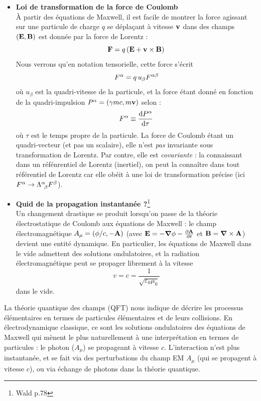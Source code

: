 \begin{itemize}
    \item \textbf{Loi de transformation de la force de Coulomb}\\
    À partir des équations de Maxwell, il est facile de montrer la force agissant sur une particule de charge $q$ se déplaçant à vitesse $\bm{\mathrm{v}}$ dans des champs $(\bm{\mathrm{E}},\bm{\mathrm{B}})$ est donnée par la force de Lorentz :
    \begin{equation}
        \bm{\mathrm{F}} = q\,  (\bm{\mathrm{E}} + \bm{\mathrm{v}} \times \bm{\mathrm{B}})
    \end{equation}
    Nous verrons qu'en notation tensorielle, cette force s'écrit 
    \begin{equation}
        F^\alpha = q \, u_\beta F\indices{^\alpha ^\beta}
    \end{equation}
    où $u_\beta$ est la quadri-vitesse de la particule, et la force étant donné en fonction de la quadri-impulsion $P^\alpha = (\gamma m c, m \bm{\mathrm{v}})$ selon :
    \begin{equation}
        F^\alpha \deq \frac{\td P\indices{^\alpha}}{\td \tau}
    \end{equation}
    où $\tau$ est le temps propre de la particule. La force de Coulomb étant un quadri-vecteur (et pas un scalaire), elle n'est \emph{pas} invariante sous transformation de Lorentz. Par contre, elle est \emph{covariante} : la connaissant dans un réfénrentiel de Lorentz (inertiel), on peut la connaître dans tout référentiel de Lorentz car elle obéit à une loi de transformation précise (ici $F^\alpha \to \Lambda\indices{^\alpha_\!_\beta}F^\beta$).\\
    \item \textbf{Quid de la propagation instantanée ?}\footnote{Wald p.78}\\
    Un changement drastique se produit lorsqu'on passe de la théorie électrostatique de Coulomb aux équations de Maxwell : le champ électromagnétique $A_\mu = (\phi/c, - \bm{\mathrm{A}})$ (avec $\bm{\mathrm{E}} = - \bm{\mathrm{\nabla}} \phi - \frac{\partial \bm{\mathrm{A}}}{\partial t}$ et $\bm{\mathrm{B}} = \bm{\mathrm{\nabla}} \times \bm{\mathrm{A}}$) devient une entité dynamique. En particulier, les équations de Maxwell dans le vide admettent des solutions ondulatoires, et la radiation électromagnétique peut se propager librement à la vitesse
    \begin{equation}
        v = c = \frac{1}{\sqrt{\varepsilon_0\mu_0}}
    \end{equation}
    dans le vide.
\end{itemize}
\begin{rmk}
    La théorie quantique des champs (QFT) nous indique de décrire les processus élémentaires en termes de particules élémentaires et de leurs collisions. En électrodynamique classique, ce sont les solutions ondulatoires des équations de Maxwell qui mènent le plus naturellement à une interprétation en termes de particules : le photon ($A_\mu$) se propageant à vitesse $c$. L'interaction n'est plus instantanée, et se fait via des perturbations du champ EM $A_\mu$ (qui se propagent à vitesse $c$), ou via échange de photons dans la théorie quantique.
\end{rmk}
